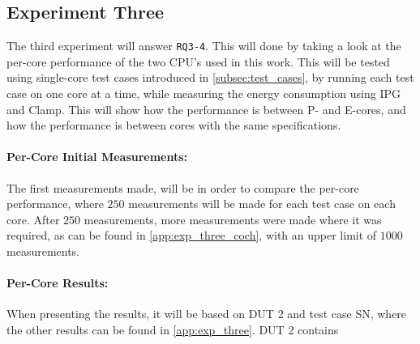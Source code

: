 \subsection{Experiment Three}\label{subsec:exp_three}

The third experiment will answer \texttt{RQ3-4}. This will done by taking a look at the per-core performance of the two CPU's used in this work. This will be tested using single-core test cases introduced in \cref{subsec:test_cases}, by running each test case on one core at a time, while measuring the energy consumption using IPG and Clamp. This will show how the performance is between P- and E-cores, and how the performance is between cores with the same specifications.

\paragraph{Per-Core Initial Measurements:} The first measurements made, will be in order to compare the per-core performance, where $250$ measurements will be made for each test case on each core. After $250$ measurements, more measurements were made where it was required, as can be found in \cref{app:exp_three_coch}, with an upper limit of $1000$ measurements.

\paragraph{Per-Core Results:} When presenting the results, it will be based on DUT 2 and test case SN, where the other results can be found in \cref{app:exp_three}. DUT 2 contains




